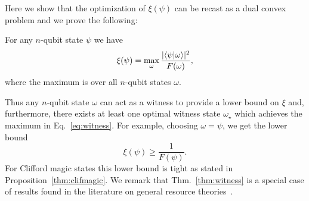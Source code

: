 Here we show that the optimization of $\xi(\psi)$ can be recast as a dual convex problem and we prove the following:
\begin{theorem}
	\label{thm:witness}
	For any $n$-qubit state $\psi$ we have
	\begin{equation}
	\xi(\psi)=\max_{\omega} \frac{|\langle \psi\vert \omega\rangle|^2}{F(\omega)},
	\label{eq:witness}
	\end{equation}
	where the maximum is over all $n$-qubit states $\omega$. 
\end{theorem}
 Thus any $n$-qubit state $\omega$ can act as a witness to provide a lower bound on $\xi$ and, furthermore, there exists at least one optimal witness state $\omega_{\star}$ which achieves the maximum in Eq.~\eqref{eq:witness}. For example, choosing $\omega=\psi$, we get the lower bound 
\begin{equation}
\xi(\psi) \geq \frac{1}{F(\psi)}.
\label{eq:mirrorwitness}
\end{equation}
For Clifford magic states this lower bound is tight as stated in Proposition~\ref{thm:clifmagic}.  We remark that Thm.~\ref{thm:witness} is a special case of results found in the literature on general resource theories~\cite{regula2017convex}.

